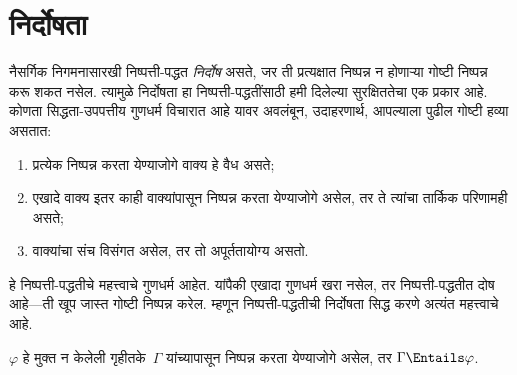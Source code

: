 \section{निर्दोषता}\label{fol:ntd:sou:sec}
\begin{explain}
नैसर्गिक निगमनासारखी निष्पत्ती-पद्धत \emph{निर्दोष} असते, जर ती
प्रत्यक्षात निष्पन्न न होणाऱ्या गोष्टी निष्पन्न करू शकत नसेल. त्यामुळे
निर्दोषता हा निष्पत्ती-पद्धतींसाठी हमी दिलेल्या सुरक्षिततेचा एक प्रकार
आहे. कोणता सिद्धता-उपपत्तीय गुणधर्म विचारात आहे यावर अवलंबून, उदाहरणार्थ,
आपल्याला पुढील गोष्टी हव्या असतात:
\begin{enumerate}
\item प्रत्येक निष्पन्न करता येण्याजोगे वाक्य हे वैध असते;
\item एखादे वाक्य इतर काही वाक्यांपासून निष्पन्न करता येण्याजोगे असेल, तर ते
  त्यांचा तार्किक परिणामही असते;
\item वाक्यांचा संच विसंगत असेल, तर तो अपूर्ततायोग्य असतो.
\end{enumerate}
हे निष्पत्ती-पद्धतीचे महत्त्वाचे गुणधर्म आहेत. यांपैकी एखादा गुणधर्म
खरा नसेल, तर निष्पत्ती-पद्धतीत दोष आहे---ती खूप जास्त गोष्टी
निष्पन्न करेल. म्हणून निष्पत्ती-पद्धतीची निर्दोषता सिद्ध करणे अत्यंत
महत्त्वाचे आहे.
\end{explain}
\begin{thm}[निर्दोषता]
\label{fol:ntd:sou:thm:soundness}
$\varphi$ हे मुक्त न केलेली गृहीतके~$\Gamma$ यांच्यापासून निष्पन्न करता येण्याजोगे असेल, तर
$\Gamma \Entails \varphi$.
\end{thm}
